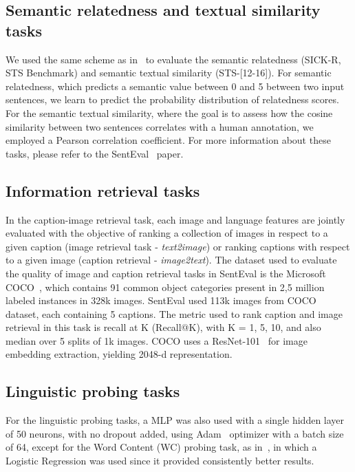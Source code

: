 \documentclass{article}
\begin{document}
\subsection{Semantic relatedness and textual similarity tasks}
We used the same scheme as in~\cite{conneau2018senteval} to evaluate the semantic relatedness (SICK-R, STS Benchmark) and semantic textual similarity (STS-[12-16]). For semantic relatedness, which predicts a semantic value between 0 and 5 between two input sentences, we learn to predict the probability distribution of relatedness scores.
For the semantic textual similarity, where the goal is to assess how the cosine similarity between two sentences
correlates with a human annotation, we employed a Pearson correlation coefficient. For more information about these tasks, please refer to the SentEval~\cite{conneau2018senteval} paper.

\subsection{Information retrieval tasks}
In the caption-image retrieval task, each image and language features are jointly evaluated with the objective of ranking a collection of images in respect to a given caption (image retrieval task - \textit{text2image}) or ranking captions with respect to a given image (caption retrieval - \textit{image2text}). The dataset used to evaluate the quality of image and caption retrieval tasks in SentEval is the Microsoft COCO~\cite{lin2014microsoft}, which contains 91 common object categories present in 2,5 million labeled instances in 328k images. SentEval used 113k images from COCO dataset, each containing 5 captions. The metric used to rank caption and image retrieval in this task is recall at K (Recall@K), with K = {1, 5, 10}, and also median over 5 splits of 1k images. COCO uses a ResNet-101~\cite{he2016deep} for image embedding extraction, yielding 2048-d representation. 


\subsection{Linguistic probing tasks}
For the linguistic probing tasks, a MLP was also used with a single hidden layer of 50 neurons, with no dropout added, using Adam~\cite{journals/corr/KingmaB14} optimizer with a batch size of 64, except for the Word Content (WC) probing task, as in~\cite{conneau2018you}, in which a Logistic Regression was used since it provided consistently better results.
\end{document}
